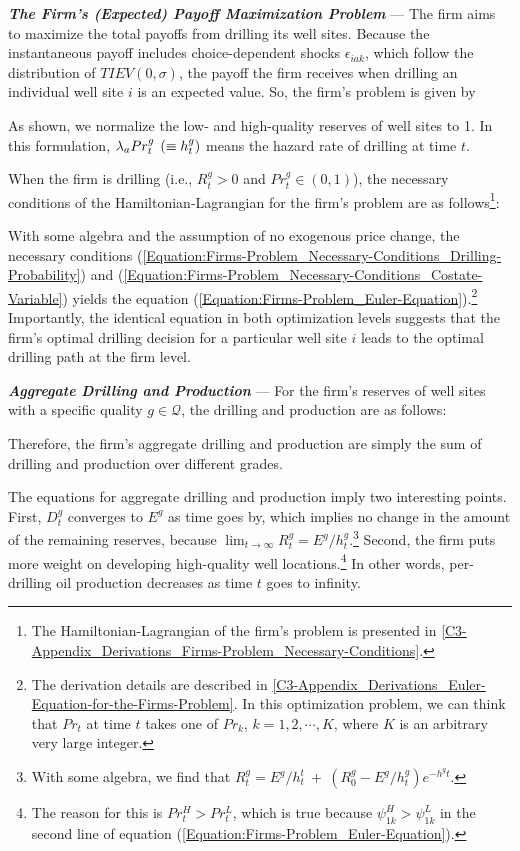 \textit{\textbf{The Firm's (Expected) Payoff Maximization Problem}} ---
The firm aims to maximize the total payoffs from drilling its well sites. Because the instantaneous payoff includes choice-dependent shocks $\epsilon_{iak}$, which follow the distribution of $TIEV(0, \sigma)$, the payoff the firm receives when drilling an individual well site $i$ is an expected value. So, the firm's problem is given by

As shown, we normalize the low- and high-quality reserves of well sites to 1. In this formulation, $\lambda_{a} Pr_{t}^{g} \hspace{0.15cm} (\equiv h_{t}^{g})$ means the hazard rate of drilling at time $t$. 

When the firm is drilling (i.e., $R_{t}^{g} > 0$ and $Pr_{t}^{g} \in (0, 1)$), the necessary conditions of the Hamiltonian-Lagrangian for the firm's problem are as follows\footnote{The Hamiltonian-Lagrangian of the firm's problem is presented in \ref{C3-Appendix_Derivations_Firms-Problem_Necessary-Conditions}.}:

With some algebra and the assumption of no exogenous price change, the necessary conditions (\ref{Equation:Firms-Problem_Necessary-Conditions_Drilling-Probability}) and (\ref{Equation:Firms-Problem_Necessary-Conditions_Costate-Variable}) yields the equation (\ref{Equation:Firms-Problem_Euler-Equation}).\footnote{The derivation details are described in \ref{C3-Appendix_Derivations_Euler-Equation-for-the-Firms-Problem}. In this optimization problem, we can think that $Pr_{t}$ at time $t$ takes one of $Pr_{k}$, $k = 1, 2, \cdots, K$, where $K$ is an arbitrary very large integer.}  Importantly, the identical equation in both optimization levels suggests that the firm's optimal drilling decision for a particular well site $i$ leads to the optimal drilling path at the firm level. 


\par
\vspace{0.3cm}
\noindent
\textit{\textbf{Aggregate Drilling and Production}} ---
For the firm's reserves of well sites with a specific quality $g \in \mathcal{Q}$, the drilling and production are as follows:

Therefore, the firm's aggregate drilling and production are simply the sum of drilling and production over different grades. 

The equations for aggregate drilling and production imply two interesting points. First, $D_{t}^{g}$ converges to $E^{g}$ as time goes by, which implies no change in the amount of the remaining reserves, because $\lim_{t \to \infty} R_{t}^{g} = E^{g} / h_{t}^{g}$.\footnote{With some algebra, we find that $R_{t}^{g} = E^{g}/h_{t}^{t} \ + \ (R_{0}^{g} - E^{g}/h_{t}^{g}) e^{-h^{g} t}$.} Second, the firm puts more weight on developing high-quality well locations.\footnote{The reason for this is $Pr_{t}^{H} > Pr_{t}^{L}$, which is true because $\psi_{1k}^{H} > \psi_{1k}^{L}$ in the second line of equation (\ref{Equation:Firms-Problem_Euler-Equation}).} In other words, per-drilling oil production decreases as time $t$ goes to infinity. 
